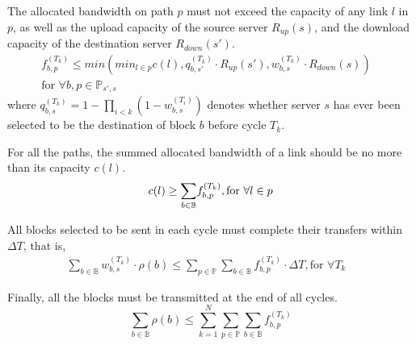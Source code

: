 \begin{packeditemize}
\item The allocated bandwidth on path $p$ must not exceed the
capacity of any link $l$ in $p$, as well as the upload capacity of
the source server $R_{up}(s)$, and the download capacity of the
destination server $R_{down}(s')$.
\begin{equation}
\begin{split}
f^{(T_k)}_{b,p} \leq min\left(min_{l\in p} c(l),
q_{b,s'}^{(T_k)}\cdot R_{up}(s'),
w_{b,s}^{(T_k)}\cdot R_{down}(s)\right) &\\
\text{for }\forall b, p\in \mathbb{P}_{s',s} &
\end{split}
\end{equation}
where $q_{b,s}^{(T_k)} = 1-\prod_{i<k} (1-w_{b,s}^{(T_i)})$ denotes
whether server $s$ has ever been selected to be the destination of
block $b$ before cycle $T_k$.

\item For all the paths, the summed allocated bandwidth of a link
should be no more than its capacity $c(l)$.
\begin{equation}
c(l) \geq \displaystyle{\sum_{b \in \mathbb{B}}}
f^{(T_k)}_{b,p},
\text{for }\forall l\in p\\
\end{equation}

\item All blocks selected to be sent in each cycle must complete
their transfers within $\Delta T$, that is,
\begin{equation}
\begin{split}
\displaystyle{\sum_{b \in \mathbb{B}}} w_{b,s}^{(T_k)} \cdot \rho(b)
\leq \displaystyle{\sum_{p\in \mathbb{P}}}
\displaystyle{\sum_{b \in \mathbb{B}}} f^{(T_k)}_{b,p} \cdot 
\Delta T,
\text{for }\forall T_k &
\end{split}
\end{equation}


\item Finally, all the blocks must be transmitted at the end of all
cycles.
\begin{equation}
\displaystyle{\sum_{b\in \mathbb{B}}} \rho(b) \leq
\displaystyle{\sum_{k=1}^{N}}
\displaystyle{\sum_{p\in \mathbb{P}}}
\displaystyle{\sum_{b\in \mathbb{B}}}
f_{b,p}^{(T_k)}
\end{equation}
\end{packeditemize}


